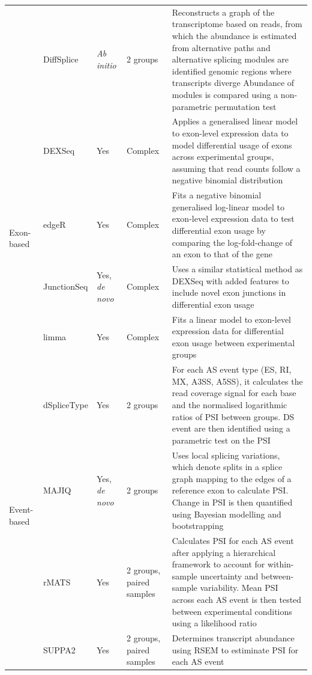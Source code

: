 \begin{landscape}
\begin{longtable}[c]{p{2.5cm}p{2cm}p{2cm}p{2.5cm}p{17cm}}
	&
	DiffSplice &
	\textit{Ab initio} &
	2 groups &
	\tabitem Reconstructs a graph of the transcriptome based on reads, from   which the abundance is estimated from alternative paths and alternative splicing modules are identified genomic regions where transcripts diverge \newline 
	\tabitem  Abundance of modules is compared using a non-parametric permutation test \\ \cmidrule(l){1-5} 
	\multirow{4}{*}{Exon-based} &
	DEXSeq &
	Yes &
	Complex &
	\tabitem Applies a generalised linear model to exon-level expression data to model differential usage of exons across experimental groups, assuming that read counts follow a negative binomial distribution \\ 		
	&
	edgeR &
	Yes &
	Complex &
	\tabitem Fits a negative binomial generalised log-linear model to exon-level expression data  to test differential exon usage by comparing the log-fold-change of an exon to that of the gene \\
	&
	JunctionSeq &
	Yes, \textit{de novo} &
	Complex &
	\tabitem Uses a similar statistical method as DEXSeq with added features to include novel exon junctions in differential exon usage \\	
	&
	limma &
	Yes &
	Complex &
	\tabitem Fits a linear model to exon-level expression data for differential exon usage between experimental groups \\ \cmidrule(l){1-5} 
	\multirow{4}{*}{Event-based} &
	dSpliceType &
	Yes &
	2 groups &
	\tabitem For each AS event type (ES, RI, MX, A3SS, A5SS), it calculates the read coverage signal for each base and the normalised  logarithmic ratios of PSI between groups. DS event are then identified using a parametric test on the PSI \\ 			
	& 
	MAJIQ &
	Yes, \textit{de novo} &
	2 groups &
	\tabitem Uses local splicing variations, which denote splits in a splice graph mapping to the edges of a reference exon to calculate PSI.   
	\tabitem Change in PSI is then quantified using Bayesian modelling and bootstrapping \\ 		

	&
	rMATS &
	Yes &
	2 groups, \newline paired samples &
	\tabitem Calculates PSI for each AS event after applying a hierarchical framework to account for within-sample uncertainty and between-sample variability.
	\tabitem Mean PSI across each AS event is then tested between experimental conditions using a likelihood ratio \\ 	
	&
	SUPPA2 &
	Yes &
	2 groups, \newline paired samples &
	\tabitem Determines transcript abundance using RSEM to estiminate PSI   for each AS event \\* \bottomrule 
	\end{longtable}
\end{landscape}
\restoregeometry

